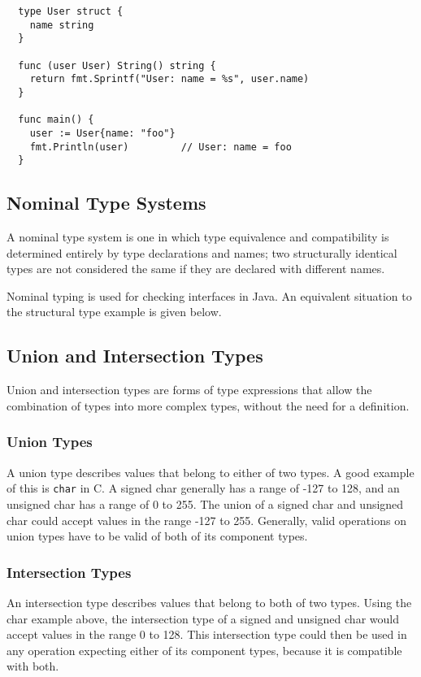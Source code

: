 \begin{verbatim}
  type User struct {
    name string
  }

  func (user User) String() string {
    return fmt.Sprintf("User: name = %s", user.name)
  }

  func main() {
    user := User{name: "foo"}
    fmt.Println(user)         // User: name = foo
  }
\end{verbatim}

\subsection{Nominal Type Systems}

A nominal type system is one in which type equivalence and compatibility is determined entirely by type declarations and names; two structurally identical types are not considered the same if they are declared with different names.

Nominal typing is used for checking interfaces in Java. An equivalent situation to the structural type example is given below.

\subsection{Union and Intersection Types}

Union and intersection types are forms of type expressions that allow the combination of types into more complex types, without the need for a definition.

\subsubsection{Union Types}

A union type describes values that belong to either of two types. A good example of this is \texttt{char} in C. A signed char generally has a range of -127 to 128, and an unsigned char has a range of 0 to 255. The union of a signed char and unsigned char could accept values in the range -127 to 255. Generally, valid operations on union types have to be valid of both of its component types.

\subsubsection{Intersection Types}

An intersection type describes values that belong to both of two types. Using the char example above, the intersection type of a signed and unsigned char would accept values in the range 0 to 128. This intersection type could then be used in any operation expecting either of its component types, because it is compatible with both.

